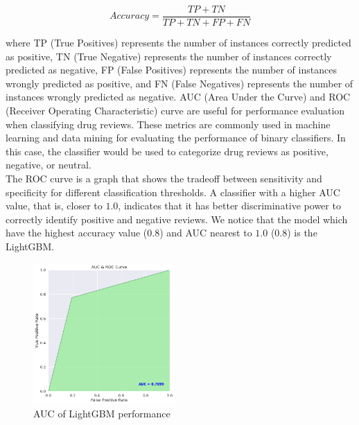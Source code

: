 \documentclass[10pt, a4paper, twocolumn]{article}
\begin{document}
        \begin{equation*}
            Accuracy = \frac{TP + TN}{TP + TN + FP + FN}
        \end{equation*}
        
        where TP (True Positives) represents the number of instances correctly predicted as positive, TN (True Negative) represents the number of instances correctly predicted as negative, FP (False Positives) represents the number of instances wrongly predicted as positive, and FN (False Negatives) represents the number of instances wrongly predicted as negative.
        AUC (Area Under the Curve) and ROC (Receiver Operating Characteristic) curve are useful for performance evaluation when classifying drug reviews. These metrics are commonly used in machine learning and data mining for evaluating the performance of binary classifiers. In this case, the classifier would be used to categorize drug reviews as positive, negative, or neutral.\\
        The ROC curve is a graph that shows the tradeoff between sensitivity and specificity for different classification thresholds. A classifier with a higher AUC value, that is, closer to $1.0$, indicates that it has better discriminative power to correctly identify positive and negative reviews.
        We notice that the model which have the highest accuracy value ($0.8$) and AUC nearest to $1.0$ ($0.8$) is the LightGBM.
        
        \begin{figure}[!ht]
                \centering
                \includegraphics[width = 0.48\textwidth]{AUC1.png}
                \caption{AUC of LightGBM performance}
                \label{fig:auc1}
            \end{figure}
\end{document}
